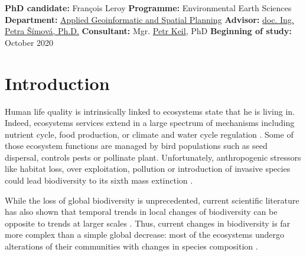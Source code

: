 \documentclass[
  12pt,
  oneside]{report}
\begin{document}
\clearpage

\textbf{PhD candidate:} François Leroy\newline
\textbf{Programme:} Environmental Earth Sciences\newline
\textbf{Department:} \href{https://www.fzp.czu.cz/en/r-9407-departments/r-9471-departments/r-9649-department-of-spatial-sciences}{Applied Geoinformatic and Spatial Planning}\newline
\textbf{Advisor:} \href{http://wp.czu.cz/cs/index.php/?r=1071\&mp=person.info\&idClovek=2155}{doc. Ing. Petra Šímová, Ph.D.}\newline
\textbf{Consultant:} Mgr. \href{http://wp.czu.cz/cs/index.php/?r=1071\&mp=person.info\&idClovek=34772}{Petr Keil}, PhD\newline
\textbf{Beginning of study:} October 2020\newline
\newline

\begingroup
\let\clearpage\relax

\hypertarget{intro}{%
\chapter{Introduction}\label{intro}}

Human life quality is intrinsically linked to ecosystems state that he is living in. Indeed, ecosystems services extend in a large spectrum of mechanisms including nutrient cycle, food production, or climate and water cycle regulation \autocite{pereira_global_2012}. Some of those ecosystem
functions are managed by bird populations such as seed dispersal, controls pests or pollinate plant.
Unfortunately, anthropogenic stressors like habitat loss, over exploitation, pollution or introduction of
invasive species could lead biodiversity to its sixth mass extinction \autocite{barnosky_has_2011}.

While the loss of global biodiversity is unprecedented, current scientific literature has also shown that
temporal trends in local changes of biodiversity can be opposite to trends at larger scales \autocite{chase_species_2019}. Thus, current changes in biodiversity is far more complex than a simple global decrease:
most of the ecosystems undergo alterations of their communities with changes in species composition \autocite{blowes_geography_2019,dornelas_assemblage_2014}.
\end{document}
